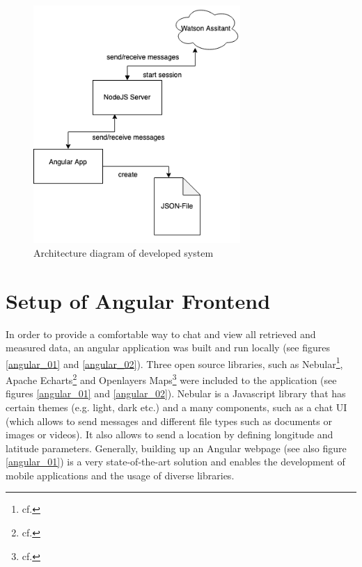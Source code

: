 \begin{figure}[h!]
	\centering
	\includegraphics[width=0.7\textwidth]{images/architecture_0102.png}
	\caption{Architecture diagram of developed system}
	\label{architecture_0102}
\end{figure}

\section{Setup of Angular Frontend} \label{frontend}
In order to provide a comfortable way to chat and view all retrieved and measured data, an angular application was built and run locally (see figures \ref{angular_01} and \ref{angular_02}). Three open source libraries, such as Nebular\footnote{cf.\autocite{nebular}}, Apache Echarts\footnote{cf.\autocite{echarts}} and Openlayers Maps\footnote{cf.\autocite{openlayers}} were included to the application (see figures \ref{angular_01} and \ref{angular_02}). Nebular is a Javascript library that has certain themes (e.g. light, dark etc.) and a many components, such as a chat UI (which allows to send messages and different file types such as documents or images or videos). It also allows to send a location by defining longitude and latitude parameters. Generally, building up an Angular webpage (see also figure \ref{angular_01}) is a very state-of-the-art solution and enables the development of mobile applications and the usage of diverse libraries.

